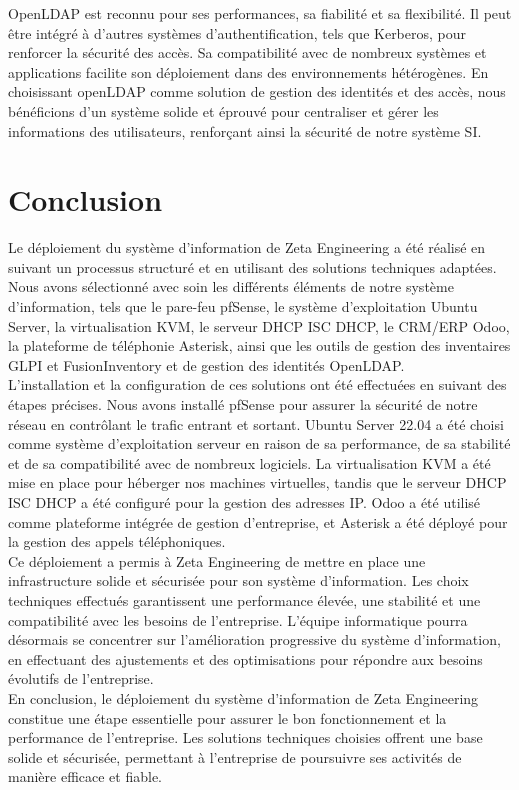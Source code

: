 OpenLDAP est reconnu pour ses performances, sa fiabilité et sa flexibilité. Il peut être intégré à d'autres systèmes d'authentification, tels que Kerberos, pour renforcer la sécurité des accès. Sa compatibilité avec de nombreux systèmes et applications facilite son déploiement dans des environnements hétérogènes. En choisissant openLDAP comme solution de gestion des identités et des accès, nous bénéficions d'un système solide et éprouvé pour centraliser et gérer les informations des utilisateurs, renforçant ainsi la sécurité de notre système SI.\\


\newpage

\section{Conclusion}

Le déploiement du système d'information de Zeta Engineering a été réalisé en suivant un processus structuré et en utilisant des solutions techniques adaptées. Nous avons sélectionné avec soin les différents éléments de notre système d'information, tels que le pare-feu pfSense, le système d'exploitation Ubuntu Server, la virtualisation KVM, le serveur DHCP ISC DHCP, le CRM/ERP Odoo, la plateforme de téléphonie Asterisk, ainsi que les outils de gestion des inventaires GLPI et FusionInventory et de gestion des identités OpenLDAP. \\

L'installation et la configuration de ces solutions ont été effectuées en suivant des étapes précises. Nous avons installé pfSense pour assurer la sécurité de notre réseau en contrôlant le trafic entrant et sortant. Ubuntu Server 22.04 a été choisi comme système d'exploitation serveur en raison de sa performance, de sa stabilité et de sa compatibilité avec de nombreux logiciels. La virtualisation KVM a été mise en place pour héberger nos machines virtuelles, tandis que le serveur DHCP ISC DHCP a été configuré pour la gestion des adresses IP. Odoo a été utilisé comme plateforme intégrée de gestion d'entreprise, et Asterisk a été déployé pour la gestion des appels téléphoniques. \\

Ce déploiement a permis à Zeta Engineering de mettre en place une infrastructure solide et sécurisée pour son système d'information. Les choix techniques effectués garantissent une performance élevée, une stabilité et une compatibilité avec les besoins de l'entreprise. L'équipe informatique pourra désormais se concentrer sur l'amélioration progressive du système d'information, en effectuant des ajustements et des optimisations pour répondre aux besoins évolutifs de l'entreprise. \\

En conclusion, le déploiement du système d'information de Zeta Engineering constitue une étape essentielle pour assurer le bon fonctionnement et la performance de l'entreprise. Les solutions techniques choisies offrent une base solide et sécurisée, permettant à l'entreprise de poursuivre ses activités de manière efficace et fiable. \\
